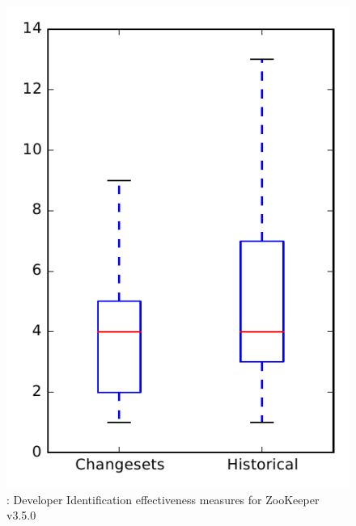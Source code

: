 
\begin{figure}
\centering
\includegraphics[height=0.4\textheight]{figures/dit/rq2_zookeeper_no_outlier}
\caption{\dtwo: Developer Identification effectiveness measures for ZooKeeper v3.5.0}
\label{fig:dit:rq2:zookeeper}
\end{figure}
